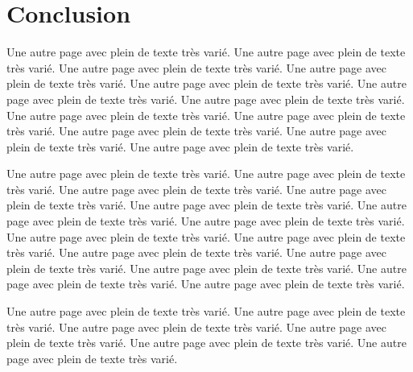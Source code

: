 \chapter*{Conclusion}

    \label{CONCLUSION}

    Une autre page avec plein de texte très varié.
    Une autre page avec plein de texte très varié.
    Une autre page avec plein de texte très varié.
    Une autre page avec plein de texte très varié.
    Une autre page avec plein de texte très varié.
    Une autre page avec plein de texte très varié.
    Une autre page avec plein de texte très varié.
    Une autre page avec plein de texte très varié.
    Une autre page avec plein de texte très varié.
    Une autre page avec plein de texte très varié.
    Une autre page avec plein de texte très varié.
    Une autre page avec plein de texte très varié.

    Une autre page avec plein de texte très varié.
    Une autre page avec plein de texte très varié.
    Une autre page avec plein de texte très varié.
    Une autre page avec plein de texte très varié.
    Une autre page avec plein de texte très varié.
    Une autre page avec plein de texte très varié.
    Une autre page avec plein de texte très varié.
    Une autre page avec plein de texte très varié.
    Une autre page avec plein de texte très varié.
    Une autre page avec plein de texte très varié.
    Une autre page avec plein de texte très varié.
    Une autre page avec plein de texte très varié.
    Une autre page avec plein de texte très varié.
    Une autre page avec plein de texte très varié.


    Une autre page avec plein de texte très varié.
    Une autre page avec plein de texte très varié.
    Une autre page avec plein de texte très varié.
    Une autre page avec plein de texte très varié.
    Une autre page avec plein de texte très varié.
    Une autre page avec plein de texte très varié.